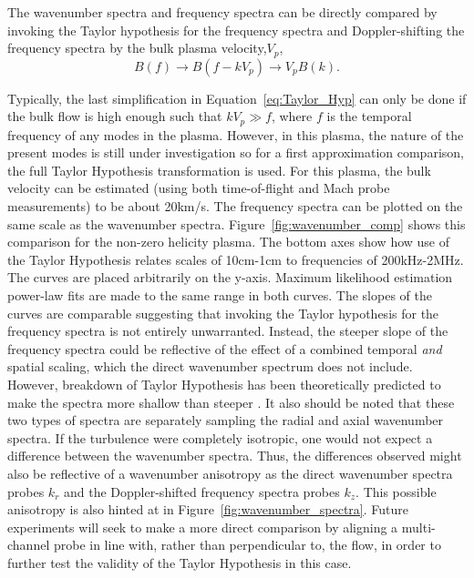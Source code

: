 \documentclass[preprint2]{aastex}
\begin{document}
The wavenumber spectra and frequency spectra can be directly compared by invoking the Taylor hypothesis for the frequency spectra and Doppler-shifting the frequency spectra by the bulk plasma velocity,$V_{p}$,
\begin{equation}
B(f) \longrightarrow B(f-kV_{p}) \longrightarrow V_{p}B(k).
\label{eq:Taylor_Hyp}
\end{equation}

Typically, the last simplification in Equation~\ref{eq:Taylor_Hyp} can only be done if the bulk flow is high enough such that $kV_{p} \gg f$, where $f$ is the temporal frequency of any modes in the plasma. However, in this plasma, the nature of the present modes is still under investigation so for a first approximation comparison, the full Taylor Hypothesis transformation is used. For this plasma, the bulk velocity can be estimated (using both time-of-flight and Mach probe measurements) to be about 20km/s. The frequency spectra can be plotted on the same scale as the wavenumber spectra. Figure~\ref{fig:wavenumber_comp} shows this comparison for the non-zero helicity plasma. The bottom axes show how use of the Taylor Hypothesis relates scales of 10cm-1cm to frequencies of 200kHz-2MHz. The curves are placed arbitrarily on the y-axis. Maximum likelihood estimation power-law fits are made to the same range in both curves. The slopes of the curves are comparable suggesting that invoking the Taylor hypothesis for the frequency spectra is not entirely unwarranted. Instead, the steeper slope of the frequency spectra could be reflective of the effect of a combined temporal {\it and} spatial scaling, which the direct wavenumber spectrum does not include. However, breakdown of Taylor Hypothesis has been theoretically predicted to make the spectra more shallow than steeper \citep{kle14}. It also should be noted that these two types of spectra are separately sampling the radial and axial wavenumber spectra. If the turbulence were completely isotropic, one would not expect a difference between the wavenumber spectra. Thus, the differences observed might also be reflective of a wavenumber anisotropy as the direct wavenumber spectra probes $k_{r}$ and the Doppler-shifted frequency spectra probes $k_{z}$. This possible anisotropy is also hinted at in Figure~\ref{fig:wavenumber_spectra}. Future experiments will seek to make a more direct comparison by aligning a multi-channel probe in line with, rather than perpendicular to, the flow, in order to further test the validity of the Taylor Hypothesis in this case.
\end{document}
